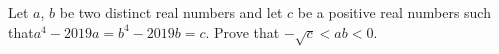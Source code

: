 Let $a$, $b$ be two distinct real numbers and let $c$ be a positive real numbers such that$a^4 - 2019a = b^4 - 2019b = c$. Prove that $- \sqrt{c} < ab < 0$.
